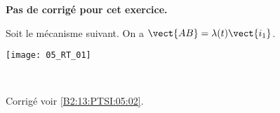 \normaltrue
\correctionfalse


\setcounter{question}{0}
\ifcorrection
\else
\textbf{Pas de corrigé pour cet exercice.}
\fi

\ifprof
\else
Soit le mécanisme suivant. On a $\vect{AB}=\lambda(t)\vect{i_1}$.
\begin{center}
\texttt{[image: 05\_RT\_01]}
\end{center}
\fi

\ifprof  ~\\

\else
\fi



\ifprof
\else
\footnotesize

\normalsize

\begin{flushright}
\footnotesize{Corrigé  voir \ref{B2:13:PTSI:05:02}.}
\end{flushright}%
\fi